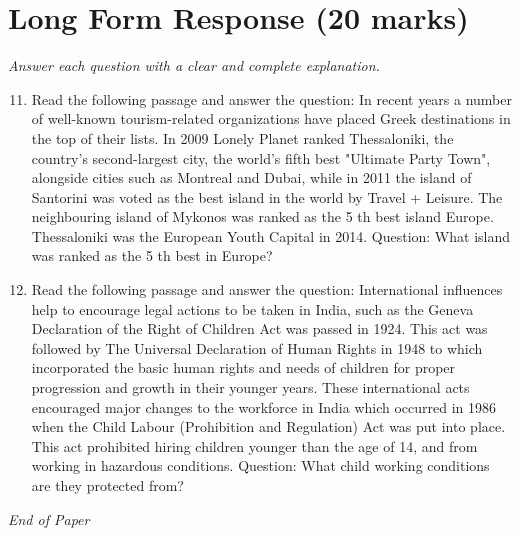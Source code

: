 \documentclass[12pt]{article}
\begin{document}
\section*{Long Form Response (20 marks)}
\textit{Answer each question with a clear and complete explanation.}
\begin{enumerate}[label=\arabic*.]
\setcounter{enumi}{10}
\item Read the following passage and answer the question: In recent years a number of well-known tourism-related organizations have placed Greek destinations in the top of their lists. In 2009 Lonely Planet ranked Thessaloniki, the country's second-largest city, the world's fifth best "Ultimate Party Town", alongside cities such as Montreal and Dubai, while in 2011 the island of Santorini was voted as the best island in the world by Travel + Leisure. The neighbouring island of Mykonos was ranked as the 5 th best island Europe. Thessaloniki was the European Youth Capital in 2014. Question: What island was ranked as the 5 th best in Europe?
\item Read the following passage and answer the question: International influences help to encourage legal actions to be taken in India, such as the Geneva Declaration of the Right of Children Act was passed in 1924. This act was followed by The Universal Declaration of Human Rights in 1948 to which incorporated the basic human rights and needs of children for proper progression and growth in their younger years. These international acts encouraged major changes to the workforce in India which occurred in 1986 when the Child Labour (Prohibition and Regulation) Act was put into place. This act prohibited hiring children younger than the age of 14, and from working in hazardous conditions. Question: What child working conditions are they protected from?
\end{enumerate}

\vfill
\noindent\textit{End of Paper}
\end{document}

